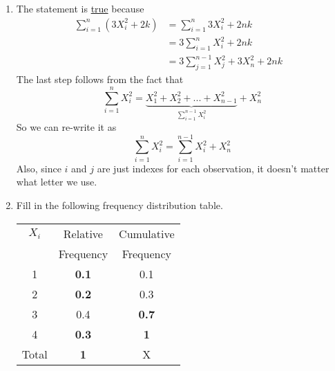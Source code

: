 \documentclass{./../../Latex/handout}
\begin{document}
\thispagestyle{plain}


\begin{enumerate}
\setlength\itemsep{2em}

\item The statement is \underline{true} because 
\begin{align*} \sum_{i=1}^n (3X_i^2 + 2k) &=  \sum_{i=1}^n 3 X_i^2 + 2nk \\
&= 3 \sum_{i=1}^n  X_i^2 + 2nk  \\
&= 3 \sum_{j=1}^{n-1} X^2_j + 3X^2_n  + 2nk  &
\end{align*} 
The last step follows from the fact that 
$$ \sum_{i=1}^n X^2_i = \underbrace{X^2_1 + X^2_2 + ... + X^2_{n-1}}_{\sum_{i=1}^{n-1} X^2_i} + X^2_n $$
So we can re-write it as 
$$  \sum_{i=1}^n X^2_i  = \sum_{i=1}^{n-1} X_i^2 + X_n^2 $$ 
Also, since $i$ and $j$ are just indexes for each observation, it doesn't matter what letter we use. 

\item Fill in the following frequency distribution table. 
\begin{center}
\begin{tabular}{|c|c|c|}
\hline
$X_i$ & Relative & Cumulative \\
& Frequency & Frequency \\
\hline
1 & \textbf{0.1} & 0.1 \\
\hline
2 & \textbf{0.2}  & 0.3 \\
\hline
3 & 0.4 & \textbf{0.7}   \\
\hline
4 & \textbf{0.3} & \textbf{1} \\
\hline
Total & \textbf{1}  & X \\
\hline
\end{tabular}
\end{center}


\end{enumerate}
\end{document}
